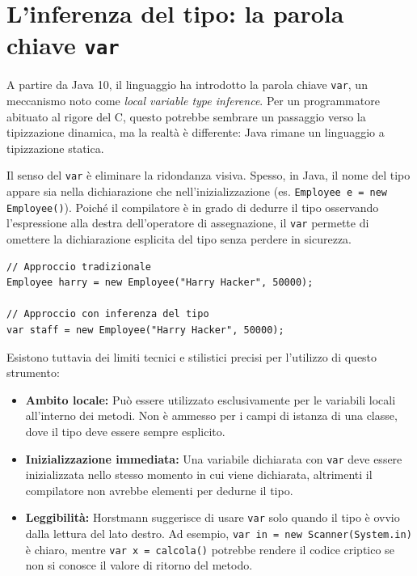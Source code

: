 \section{L'inferenza del tipo: la parola chiave \texttt{var}}

A partire da Java 10, il linguaggio ha introdotto la parola chiave \texttt{var}, un meccanismo noto come \textit{local variable type inference}. Per un programmatore abituato al rigore del C, questo potrebbe sembrare un passaggio verso la tipizzazione dinamica, ma la realtà è differente: Java rimane un linguaggio a tipizzazione statica.

Il senso del \texttt{var} è eliminare la ridondanza visiva. Spesso, in Java, il nome del tipo appare sia nella dichiarazione che nell'inizializzazione (es. \texttt{Employee e = new Employee()}). Poiché il compilatore è in grado di dedurre il tipo osservando l'espressione alla destra dell'operatore di assegnazione, il \texttt{var} permette di omettere la dichiarazione esplicita del tipo senza perdere in sicurezza.

\begin{lstlisting}[caption={Confronto tra dichiarazione esplicita e var}]
// Approccio tradizionale
Employee harry = new Employee("Harry Hacker", 50000);

// Approccio con inferenza del tipo
var staff = new Employee("Harry Hacker", 50000); 
\end{lstlisting}

Esistono tuttavia dei limiti tecnici e stilistici precisi per l'utilizzo di questo strumento:
\begin{itemize}
    \item \textbf{Ambito locale:} Può essere utilizzato esclusivamente per le variabili locali all'interno dei metodi. Non è ammesso per i campi di istanza di una classe, dove il tipo deve essere sempre esplicito.
    \item \textbf{Inizializzazione immediata:} Una variabile dichiarata con \texttt{var} deve essere inizializzata nello stesso momento in cui viene dichiarata, altrimenti il compilatore non avrebbe elementi per dedurne il tipo.
    \item \textbf{Leggibilità:} Horstmann suggerisce di usare \texttt{var} solo quando il tipo è ovvio dalla lettura del lato destro. Ad esempio, \texttt{var in = new Scanner(System.in)} è chiaro, mentre \texttt{var x = calcola()} potrebbe rendere il codice criptico se non si conosce il valore di ritorno del metodo.
\end{itemize}

